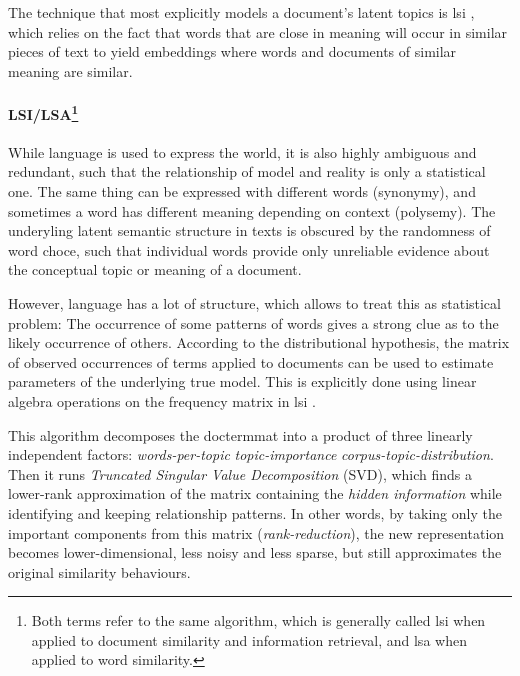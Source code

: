 
The technique that most explicitly models a document's latent topics is \gls{lsi} \cite{deerwester90}, which relies on the fact that words that are close in meaning will occur in similar pieces of text to yield embeddings where words and documents of similar meaning are similar. 

\paragraph*{LSI/LSA\footnote{Both terms refer to the same algorithm, which is generally called \gls{lsi} when applied to document similarity and information retrieval, and \gls{lsa} when applied to word similarity.}}
\label{sec:lsi}

While language is used to express the world, it is also highly ambiguous and redundant, such that the relationship of model and reality is only a statistical one. The same thing can be expressed with different words (synonymy), and sometimes a word has different meaning depending on context (polysemy). The underyling latent semantic structure in texts is obscured by the randomness of word choce, such that individual words provide only unreliable evidence about the conceptual topic or meaning of a document.

However, language has a lot of structure, which allows to treat this as statistical problem: The occurrence of some patterns of words gives a strong clue as to the likely occurrence of others. According to the distributional hypothesis, the matrix of observed occurrences of terms applied to documents can be used to estimate parameters of the underlying true model. This is explicitly done using linear algebra operations on the frequency matrix in \gls{lsi} \cite{deerwester90}. 

This algorithm decomposes the \gls{doctermmat} into a product of three linearly independent factors: \textit{words-per-topic} \texttimes \textit{topic-importance} \texttimes \textit{corpus-topic-distribution}. Then it runs \textit{Truncated Singular Value Decomposition} (SVD), which finds a lower-rank approximation of the matrix containing the \textit{hidden information} while identifying and keeping relationship patterns. In other words, by taking only the important components from this matrix (\textit{rank-reduction}), the new representation becomes lower-dimensional, less noisy and less sparse, but still approximates the original similarity behaviours.

